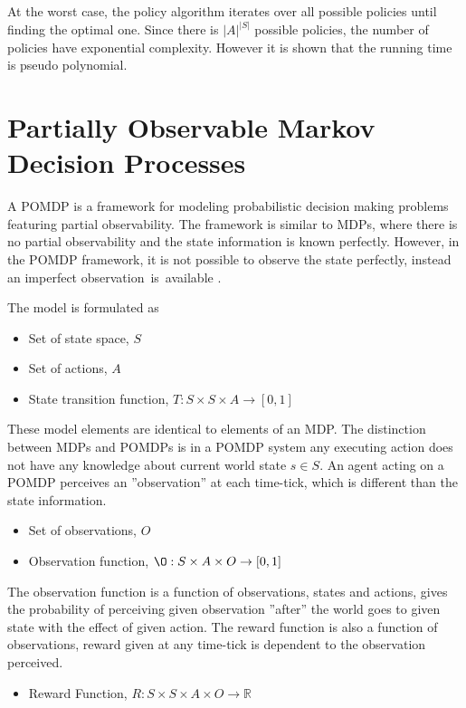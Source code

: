 At the worst case, the policy algorithm iterates over all possible policies until finding the optimal one. Since there is $|A|^{|S|}$ possible policies, the number of policies have exponential complexity. However it is shown that the running time is pseudo polynomial\cite{littman95}.

\section{Partially Observable Markov Decision Processes}
\label{section:pomdp}
A POMDP is a framework for modeling probabilistic decision making problems featuring partial observability.
The framework is similar to MDPs, where there is no partial observability and the state information is known
perfectly. However, in the POMDP framework, it is not possible to observe the state perfectly, instead an
imperfect observation~is~available \cite{Kaelbling98,Cassandra94,Cassandra98}.

The model is formulated as

\begin{itemize}
\item Set of state space, $S$
\item Set of actions, $A$
\item State transition function, $T : S \times S \times A \to [0,1]$
\end{itemize}

These model elements are identical to elements of an MDP. The distinction between MDPs and POMDPs is in a POMDP system any executing action does not have any knowledge about current world state $s \in S$. An agent acting on a POMDP perceives an ''observation'' at each time-tick, which is different than the state information.

\begin{itemize}
\item Set of observations, $O$
\item Observation function, $\O : S \times A \times O \to [0,1]$
\end{itemize}

The observation function is a function of observations, states and actions, gives the probability of perceiving given observation ''after'' the world goes to given state with the effect of given action. The reward function is also a function of observations, reward given at any time-tick is dependent to the observation perceived.

\begin{itemize}
\item Reward Function, $R : S \times S \times A \times O \to \mathbb{R}$
\end{itemize}

